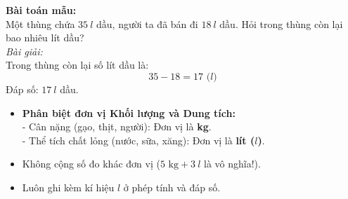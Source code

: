 \documentclass[11pt,a4paper]{article}
\begin{document}
\vspace{-1.5mm}
\noindent
\begin{minipage}[t]{0.49\textwidth}\vspace{0pt}
\begin{tcolorbox}[
  enhanced,
  colback=green!4!white,
  colframe=green!60!black,
  arc=2mm, boxrule=0.8pt,
  left=2mm, right=2mm, top=1.8mm, bottom=1.8mm,
  title={\footnotesize\bfseries\color{white}\faCheckCircle\ 4. Ví dụ thực hành chuẩn mực}
]
{\footnotesize
\textbf{Bài toán mẫu:}\\
Một thùng chứa $35\ l$ dầu, người ta đã bán đi $18\ l$ dầu. Hỏi trong thùng còn lại bao nhiêu lít dầu?\\
\textit{Bài giải:}\\
Trong thùng còn lại số lít dầu là:
$$35 - 18 = 17\text{ (}l\text{)}$$
Đáp số: $17\ l$ dầu.
}
\end{tcolorbox}
\end{minipage}
\hfill
\begin{minipage}[t]{0.49\textwidth}\vspace{0pt}
\begin{tcolorbox}[
  enhanced,
  colback=red!4!white,
  colframe=red!75!black,
  arc=2mm, boxrule=0.8pt,
  left=2mm, right=2mm, top=1.8mm, bottom=1.8mm,
  title={\footnotesize\bfseries\color{white}\faExclamationTriangle\ 5. Mẹo tránh bẫy trắc nghiệm}
]
{\footnotesize
\begin{itemize}\setlength{\itemsep}{1pt}\setlength{\leftskip}{-2.5mm}
  \item \textbf{Phân biệt đơn vị Khối lượng và Dung tích:}\\
  - Cân nặng (gạo, thịt, người): Đơn vị là \textbf{kg}.\\
  - Thể tích chất lỏng (nước, sữa, xăng): Đơn vị là \textbf{lít ($l$)}.
  \item Không cộng số đo khác đơn vị ($5\text{ kg} + 3\ l$ là vô nghĩa!).
  \item Luôn ghi kèm kí hiệu $l$ ở phép tính và đáp số.
\end{itemize}
}
\end{tcolorbox}
\end{minipage}
\end{document}
